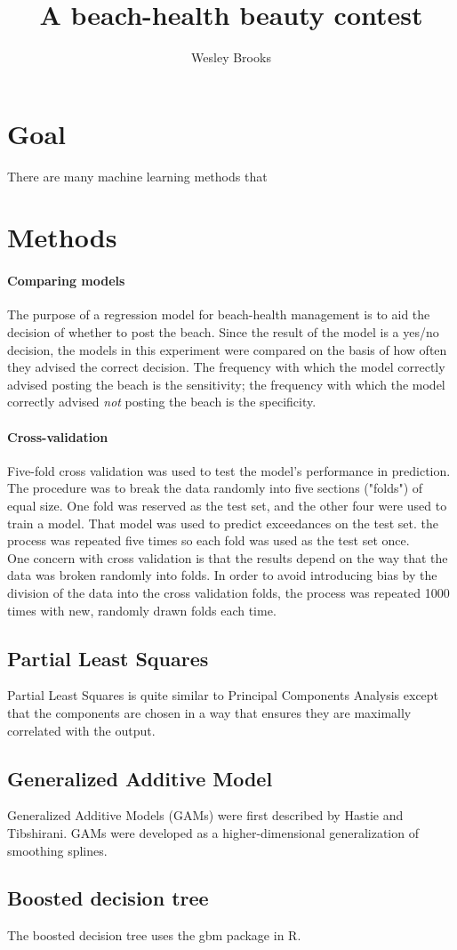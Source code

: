\documentclass[10pt]{article}
\title{A beach-health beauty contest}
\author{Wesley Brooks}
\date{}                                           %
\begin{document}
\maketitle

\section{Goal}
There are many machine learning methods that 


\section{Methods}
\paragraph{Comparing models}
The purpose of a regression model for beach-health management is to aid the decision of whether to post the beach. Since the result of the model is a yes/no decision, the models in this experiment were compared on the basis of how often they advised the correct decision. The frequency with which the model correctly advised posting the beach is the sensitivity; the frequency with which the model correctly advised \emph{not} posting the beach is the specificity.

\paragraph{Cross-validation} Five-fold cross validation was used to test the model's performance in prediction. The procedure was to break the data randomly into five sections ("folds") of equal size. One fold was reserved as the test set, and the other four were used to train a model. That model was used to predict exceedances on the test set. the process was repeated five times so each fold was used as the test set once.\\

One concern with cross validation is that the results depend on the way that the data was broken randomly into folds. In order to avoid introducing bias by the division of the data into the cross validation folds, the process was repeated 1000 times with new, randomly drawn folds each time.\\

\subsection{Partial Least Squares}
Partial Least Squares is quite similar to Principal Components Analysis except that the components are chosen in a way that ensures they are maximally correlated with the output.\\


\subsection{Generalized Additive Model}
Generalized Additive Models (GAMs) were first described by Hastie and Tibshirani. GAMs were developed as a higher-dimensional generalization of smoothing splines.\\


\subsection{Boosted decision tree}
The boosted decision tree uses the gbm package in R.\\
\end{document}
